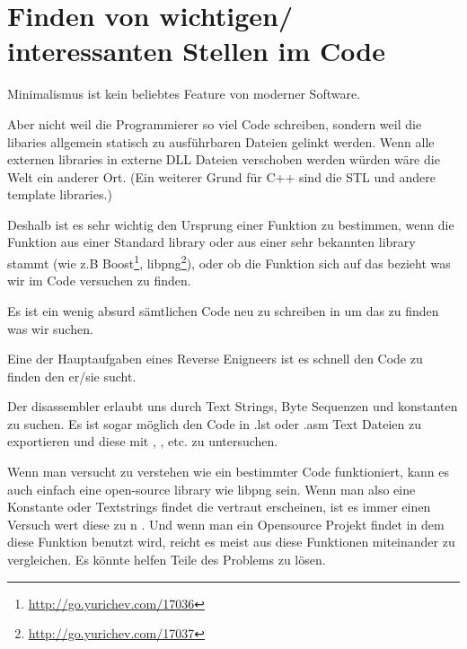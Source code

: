 \chapter{Finden von wichtigen/ interessanten Stellen im Code}

Minimalismus ist kein beliebtes Feature von moderner Software.


Aber nicht weil die Programmierer so viel Code schreiben, sondern weil die libaries allgemein statisch zu ausführbaren
Dateien gelinkt werden. 
Wenn alle externen libraries in externe DLL Dateien verschoben werden würden wäre die Welt ein anderer Ort.
(Ein weiterer Grund für C++ sind die \ac{STL} und andere template libraries.)

\newcommand{\FOOTNOTEBOOST}{\footnote{\url{http://go.yurichev.com/17036}}}
\newcommand{\FOOTNOTELIBPNG}{\footnote{\url{http://go.yurichev.com/17037}}}

Deshalb ist es sehr wichtig den Ursprung einer Funktion zu bestimmen, wenn die Funktion aus 
einer Standard library oder aus einer sehr bekannten library stammt (wie z.B Boost\FOOTNOTEBOOST, libpng\FOOTNOTELIBPNG),
oder ob die Funktion sich auf das bezieht was wir im Code versuchen zu finden.

Es ist ein wenig absurd sämtlichen Code neu zu schreiben in \CCpp um das zu finden 
was wir suchen.

Eine der Hauptaufgaben eines Reverse Enigneers ist es schnell den Code zu finden den er/sie sucht. %

\myindex{\GrepUsage}

Der \IDA disassembler erlaubt uns durch Text Strings, Byte Sequenzen und konstanten zu suchen. %
Es ist sogar möglich den Code in .lst oder .asm Text Dateien zu exportieren und diese mit , , etc. zu untersuchen.


Wenn man versucht zu verstehen wie ein bestimmter Code funktioniert, kann es auch einfach eine open-source library wie libpng sein. %
Wenn man also eine Konstante oder Textstrings findet die vertraut erscheinen, ist es immer einen Versuch wert diese zu n .
Und wenn man ein Opensource Projekt findet in dem diese Funktion benutzt wird, 
reicht es meist aus diese Funktionen miteinander zu vergleichen.
Es könnte helfen Teile des Problems zu lösen.

